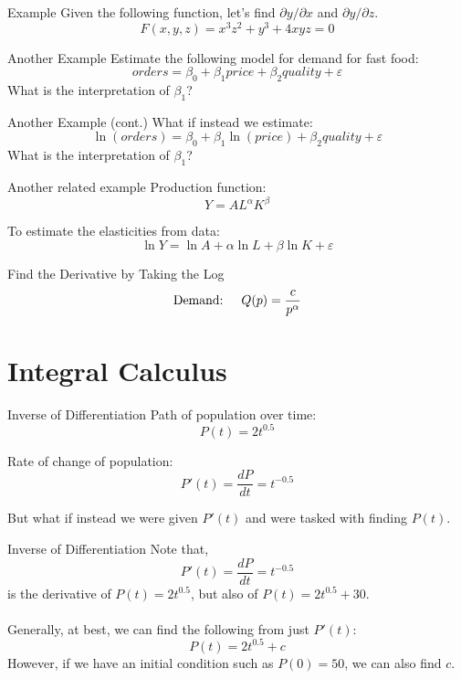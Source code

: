 \documentclass{./../../Latex/teaching_slides}
\begin{document}
\begin{frame}{Example}
Given the following function, let's find $\partial y/\partial x$ and $\partial y/\partial z$. 
$$ F(x,y,z) = x^3 z^2+y^3+4xyz = 0  $$
\end{frame}

\begin{frame}{Another Example}
Estimate the following model for demand for fast food:
$$ orders = \beta_0 + \beta_1 price + \beta_2 quality + \varepsilon   $$
What is the interpretation of $\beta_1$?
\end{frame}

\begin{frame}{Another Example (cont.)}
What if instead we estimate:
$$ \ln(orders) = \beta_0 + \beta_1 \ln(price) + \beta_2 quality + \varepsilon   $$
What is the interpretation of $\beta_1$?
\end{frame}

\begin{frame}{Another related example}
Production function: 
$$ Y = A L^{\alpha} K^\beta  $$ \vspace{0.5em}

To estimate the elasticities from data:
$$ \ln Y = \ln A + \alpha \ln L+ \beta \ln K + \varepsilon $$

\end{frame}


\begin{frame}{Find the Derivative by Taking the Log}
$$ \text{Demand: \quad} Q(p) = \frac{c}{p^{\alpha}} $$
\end{frame}

\section{Integral Calculus}

\begin{frame}{Inverse of Differentiation}
Path of population over time: 
$$ P(t) = 2 t^{0.5} $$

Rate of change of population:
$$ P'(t)= \frac{d P}{dt} = t^{-0.5} $$

But what if instead we were given $P'(t)$ and were tasked with finding $P(t)$. 
\end{frame}

\begin{frame}{Inverse of Differentiation}
Note that,
$$ P'(t)= \frac{d P}{dt} = t^{-0.5} $$
is the derivative of $P(t) = 2 t^{0.5}$, but also of $P(t) = 2 t^{0.5} + 30$.\\~\\
Generally, at best, we can find the following from just $P'(t)$:
$$P(t) = 2 t^{0.5} + c$$
However, if we have an initial condition such as $ P(0) = 50 $, we can also find $c$.
\end{frame}
\end{document}

